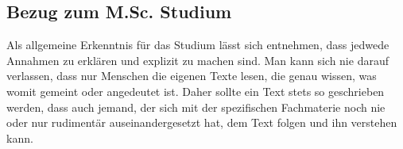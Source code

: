 \documentclass[12pt,ngerman,a4paper]{scrartcl}
\theoremstyle{plain}
\theoremstyle{definition}
\theoremstyle{remark}
\begin{document}
\subsection{Bezug zum M.Sc. Studium}

Als allgemeine Erkenntnis für das Studium lässt sich entnehmen, dass jedwede
Annahmen zu erklären und explizit zu machen sind. Man kann sich nie darauf verlassen,
dass nur Menschen die eigenen Texte lesen, die genau wissen, was womit gemeint
oder angedeutet ist. Daher sollte ein Text stets so geschrieben werden, dass auch
jemand, der sich mit der spezifischen Fachmaterie noch nie oder nur rudimentär
auseinandergesetzt hat, dem Text folgen und ihn verstehen kann.


\newpage

\printbibliography
\end{document}
